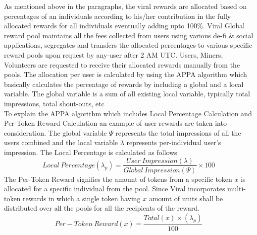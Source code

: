 \documentclass[conference]{IEEEtran}
\begin{document}
As mentioned above in the paragraphs, the viral rewards are allocated based on percentages of an individuals according to his/her contribution in the fully allocated rewards for all individuals eventually adding upto 100\%.  Viral Global reward pool maintains all the fees collected from users using various de-fi \& social applications, segregates and transfers the allocated percentages to various specific reward pools upon request by any-user after 2  AM UTC. Users, Miners, Volunteers are requested to receive their allocated rewards manually from the pools. The allocation per user is calculated by using the APPA algorithm which basically calculates the percentage of rewards by including a global and a local variable. The global variable is a sum of all existing local variable, typically total impressions, total shout-outs, etc\\
To explain the APPA algorithm which includes Local Percentage Calculation and Per-Token Reward Calculation an example of user rewards are taken into consideration.  The global variable $	\Psi$ represents the total impressions of all the users combined and the local variable $\lambda$ represents per-individual user's impression.  The Local Percentage is calculated as follows \\
\[Local\:Percentage(\lambda_p)=\frac{User\:Impression(\lambda)}{Global\:Impression(\Psi)} \times 100\]
The Per-Token Reward signifies the amount of tokens from a specific token $x$ is allocated for a specific individual from the pool. Since Viral incorporates multi-token rewards in which a single token having $x$ amount of units shall be distributed over all the pools for all the recipients of the reward. \\
\[Per-Token\:Reward(x)=\frac{Total(x) \times (\lambda_p)}{100}\]
\end{document}
